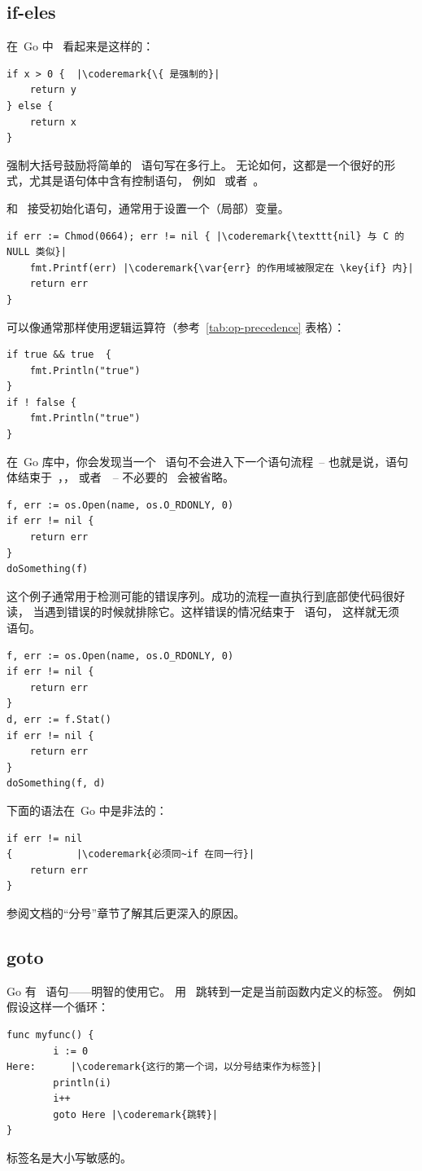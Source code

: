 \subsection{if-eles}
在~Go 中~ 看起来是这样的：
\begin{lstlisting}
if x > 0 {	|\coderemark{\{ 是强制的}|
    return y
} else {
    return x
}
\end{lstlisting}
强制大括号鼓励将简单的~ 语句写在多行上。
无论如何，这都是一个很好的形式，尤其是语句体中含有控制语句，
例如~ 或者~。

 和~ 接受初始化语句，通常用于设置一个（局部）变量。
\begin{lstlisting}
if err := Chmod(0664); err != nil { |\coderemark{\texttt{nil} 与 C 的 NULL 类似}|
    fmt.Printf(err) |\coderemark{\var{err} 的作用域被限定在 \key{if} 内}|
    return err
}
\end{lstlisting}
可以像通常那样使用逻辑运算符（参考~\ref{tab:op-precedence} 表格）：
\begin{lstlisting}
if true && true  {
    fmt.Println("true")
}
if ! false {
    fmt.Println("true")
}
\end{lstlisting}

在~Go 库中，你会发现当一个~ 语句不会进入下一个语句流程~-- 
也就是说，语句体结束于~，，
或者~~-- 不必要的~ 会被省略。

\begin{lstlisting}
f, err := os.Open(name, os.O_RDONLY, 0)
if err != nil {
    return err
}
doSomething(f)
\end{lstlisting}
这个例子通常用于检测可能的错误序列。成功的流程一直执行到底部使代码很好读，
当遇到错误的时候就排除它。这样错误的情况结束于~ 语句，
这样就无须~ 语句。
\begin{lstlisting}
f, err := os.Open(name, os.O_RDONLY, 0)
if err != nil {
    return err
}
d, err := f.Stat()
if err != nil {
    return err
}
doSomething(f, d)
\end{lstlisting}
下面的语法在~Go 中是非法的：
\begin{lstlisting}
if err != nil
{		    |\coderemark{必须同~if 在同一行}|
    return err
}
\end{lstlisting}
参阅文档\cite{effective_go}的``分号''章节了解其后更深入的原因。


\subsection{goto}
Go 有~ 语句——明智的使用它。
用~ 跳转到一定是当前函数内定义的标签。
例如假设这样一个循环：
\begin{lstlisting}
func myfunc() {
        i := 0                                                                                      
Here:	   |\coderemark{这行的第一个词，以分号结束作为标签}|
        println(i)
        i++ 
        goto Here |\coderemark{跳转}|
}
\end{lstlisting}
标签名是大小写敏感的。

